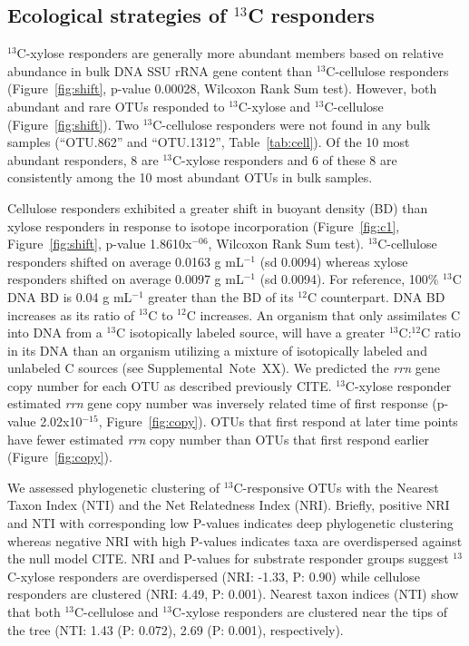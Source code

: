\subsection{Ecological strategies of $^{13}$C responders}
$^{13}$C-xylose responders are generally more abundant members based on
relative abundance in bulk DNA SSU rRNA gene content than $^{13}$C-cellulose
responders (Figure~\ref{fig:shift}, p-value 0.00028, Wilcoxon Rank Sum test).
However, both abundant and rare OTUs responded to $^{13}$C-xylose and
$^{13}$C-cellulose (Figure~\ref{fig:shift}). Two $^{13}$C-cellulose responders
were not found in any bulk samples (``OTU.862'' and ``OTU.1312'',
Table~\ref{tab:cell}). Of the 10 most abundant responders, 8 are
$^{13}$C-xylose responders and 6 of these 8 are consistently among the 10 most
abundant OTUs in bulk samples.

Cellulose responders exhibited a greater shift in buoyant density (BD) than
xylose responders in response to isotope incorporation (Figure~\ref{fig:c1},
Figure~\ref{fig:shift}, p-value 1.8610x$^{-06}$, Wilcoxon Rank Sum test).
$^{13}$C-cellulose responders shifted on average
0.0163 g mL$^{-1}$ (sd 0.0094) whereas xylose responders shifted on average
0.0097 g mL$^{-1}$ (sd 0.0094). For reference, 100\% $^{13}$C DNA BD is 0.04
g mL$^{-1}$ greater than the BD of its $^{12}$C counterpart. DNA BD increases
as its ratio of $^{13}$C to $^{12}$C increases. An organism that only
assimilates C into DNA from a $^{13}$C isotopically labeled source, will have
a greater $^{13}$C:$^{12}$C ratio in its DNA than an organism utilizing
a mixture of isotopically labeled and unlabeled C sources (see
Supplemental~Note~XX). We predicted the \textit{rrn} gene copy number for each
OTU as described previously CITE. $^{13}$C-xylose responder estimated
\textit{rrn} gene copy number was inversely related time of first response
(p-value 2.02x10$^{-15}$, Figure~\ref{fig:copy}). OTUs that first respond at
later time points have fewer estimated \textit{rrn} copy number than OTUs that
first respond earlier (Figure~\ref{fig:copy}). 

We assessed phylogenetic clustering of $^{13}$C-responsive OTUs with the
Nearest Taxon Index (NTI) and the Net Relatedness Index (NRI). Briefly,
positive NRI and NTI with corresponding low P-values indicates deep
phylogenetic clustering whereas negative NRI with high P-values indicates taxa
are overdispersed against the null model CITE. NRI and P-values for substrate
responder groups suggest $^{13}$C-xylose responders are overdispersed (NRI:
-1.33, P: 0.90) while cellulose responders are clustered (NRI: 4.49, P: 0.001).
Nearest taxon indices (NTI) show that both $^{13}$C-cellulose and
$^{13}$C-xylose responders are clustered near the tips of the tree (NTI: 1.43
(P: 0.072), 2.69 (P: 0.001), respectively). 





